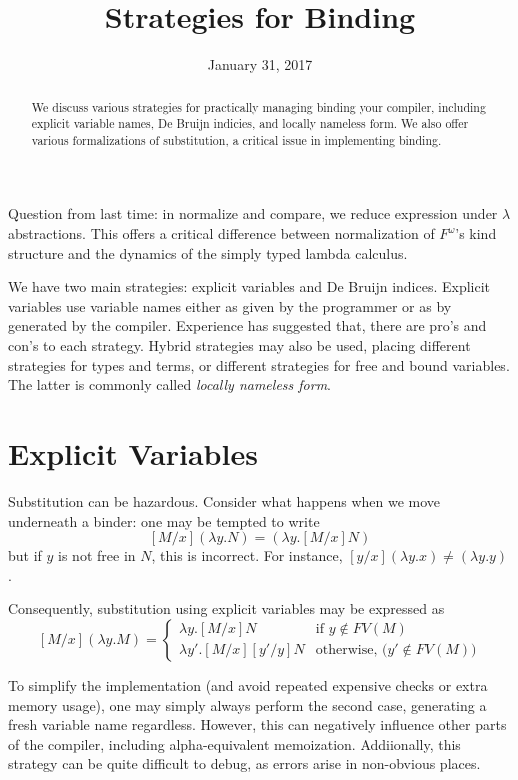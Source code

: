 \documentclass{article}
\title{Strategies for Binding}
\date{January 31, 2017}
\newcommand{\defn}[1]{\textit{#1}}
\begin{document}
\maketitle
\begin{abstract}
  We discuss various strategies for practically managing binding your
  compiler, including explicit variable names, De Bruijn indicies, and locally
  nameless form. We also offer various formalizations of substitution, a
  critical issue in implementing binding.
\end{abstract}

Question from last time: in normalize and compare, we reduce expression under
$\lambda$ abstractions. This offers a critical difference between normalization
of $F^\omega$'s kind structure and the dynamics of the simply typed lambda
calculus.

We have two main strategies: explicit variables and De Bruijn indices. Explicit
variables use variable names either as given by the programmer or as by
generated by the compiler. Experience has suggested that, there are pro's and
con's to each strategy. Hybrid strategies may also be used, placing different
strategies for types and terms, or different strategies for free and bound
variables. The latter is commonly called \defn{locally nameless form}.

\section{Explicit Variables}

Substitution can be hazardous. Consider what happens when we move underneath a
binder: one may be tempted to write
\[
[M/x](\lambda y. N) = (\lambda y. [M/x]N)
\]
but if $y$ is not free in $N$, this is incorrect. For instance, $[y/x](\lambda
y. x) \not= (\lambda y. y)$.

Consequently, substitution using explicit variables may be expressed as
\[
  [M/x](\lambda y. M) = \begin{cases}
  \lambda y. [M/x]N& \text{if $y \not\in FV(M)$}\\
  \lambda y'. [M/x][y'/y]N& \text{otherwise, ($y' \not\in FV(M)$)}
  \end{cases}
\]

To simplify the implementation (and avoid repeated expensive checks or extra
memory usage), one may simply always perform the second case, generating a fresh
variable name regardless. However, this can negatively influence other parts of
the compiler, including alpha-equivalent memoization. Addiionally, this strategy
can be quite difficult to debug, as errors arise in non-obvious places.
\end{document}
